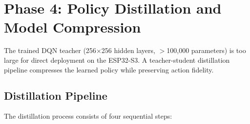 \section{Phase 4: Policy Distillation and Model Compression}
    \label{sec:Distillation}

    The trained DQN teacher (256$\times$256 hidden layers, $>$100,000 parameters) is too large for direct deployment on the ESP32-S3. A teacher-student distillation pipeline compresses the learned policy while preserving action fidelity.

    \subsection{Distillation Pipeline}

    The distillation process consists of four sequential steps:

